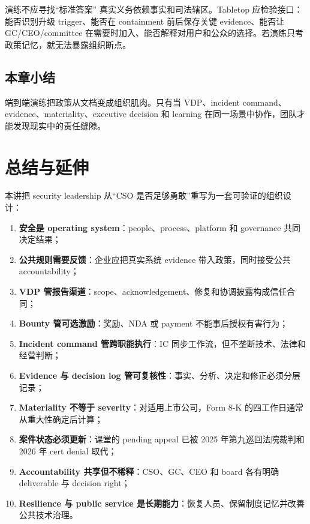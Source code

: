 \documentclass[a4paper]{article}
\begin{document}
\begin{warningbox}{演练不应寻找“标准答案”}
真实义务依赖事实和司法辖区。Tabletop 应检验接口：能否识别升级 trigger、能否在 containment 前后保存关键 evidence、能否让 GC/CEO/committee 在需要时加入、能否解释对用户和公众的选择。若演练只考政策记忆，就无法暴露组织断点。
\end{warningbox}

\subsection{本章小结}

端到端演练把政策从文档变成组织肌肉。只有当 VDP、incident command、evidence、materiality、executive decision 和 learning 在同一场景中协作，团队才能发现现实中的责任缝隙。

\section{总结与延伸}

本讲把 security leadership 从“CSO 是否足够勇敢”重写为一套可验证的组织设计：

\begin{enumerate}
  \item \textbf{安全是 operating system}：people、process、platform 和 governance 共同决定结果；
  \item \textbf{公共规则需要反馈}：企业应把真实系统 evidence 带入政策，同时接受公共 accountability；
  \item \textbf{VDP 管报告渠道}：scope、acknowledgement、修复和协调披露构成信任合同；
  \item \textbf{Bounty 管可选激励}：奖励、NDA 或 payment 不能事后授权有害行为；
  \item \textbf{Incident command 管跨职能执行}：IC 同步工作流，但不垄断技术、法律和经营判断；
  \item \textbf{Evidence 与 decision log 管可复核性}：事实、分析、决定和修正必须分层记录；
  \item \textbf{Materiality 不等于 severity}：对适用上市公司，Form 8-K 的四工作日通常从重大性确定后计算；
  \item \textbf{案件状态必须更新}：课堂的 pending appeal 已被 2025 年第九巡回法院裁判和 2026 年 cert denial 取代；
  \item \textbf{Accountability 共享但不稀释}：CSO、GC、CEO 和 board 各有明确 deliverable 与 decision right；
  \item \textbf{Resilience 与 public service 是长期能力}：恢复人员、保留制度记忆并改善公共技术治理。
\end{enumerate}
\end{document}
